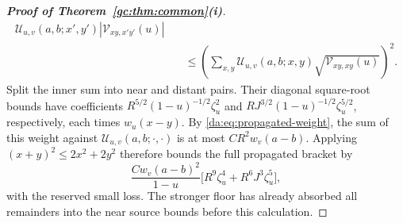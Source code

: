 \documentclass[11pt]{article}
\numberwithin{equation}{section}
\theoremstyle{remark}
\begin{document}
\begin{proof}[\textbf{Proof of Theorem~\ref{gc:thm:common}(i)}]
\[\begin{aligned}
       \mathcal U_{u,v}(a,b;x',y')|\mathcal V_{xy,x'y'}(u)|\\
 &\quad\le\left(\sum_{x,y}\mathcal U_{u,v}(a,b;x,y)
                   \sqrt{\mathcal V_{xy,xy}(u)}\right)^2.
 \end{aligned}
\]
Split the inner sum into near and distant pairs. Their diagonal
square-root bounds have coefficients
$R^{5/2}(1-u)^{-1/2}\zeta_u^2$ and
$RJ^{3/2}(1-u)^{-1/2}\zeta_u^{5/2}$, respectively, each times
$w_u(x-y)$. By \eqref{da:eq:propagated-weight}, the sum of this weight
against $\mathcal U_{u,v}(a,b;\cdot,\cdot)$ is at most
$CR^2w_v(a-b)$. Applying $(x+y)^2\le2x^2+2y^2$ therefore bounds
the full propagated bracket by
\begin{equation}\label{fo:eq:propagated-pair-bracket}
 \frac{Cw_v(a-b)^2}{1-u}
       \bigl[R^9\zeta_u^4+R^6J^3\zeta_u^5\bigr],
\end{equation}
with the reserved small loss. The stronger floor has already absorbed
all remainders into the near source bounds before this calculation.


\end{proof}
\end{document}
